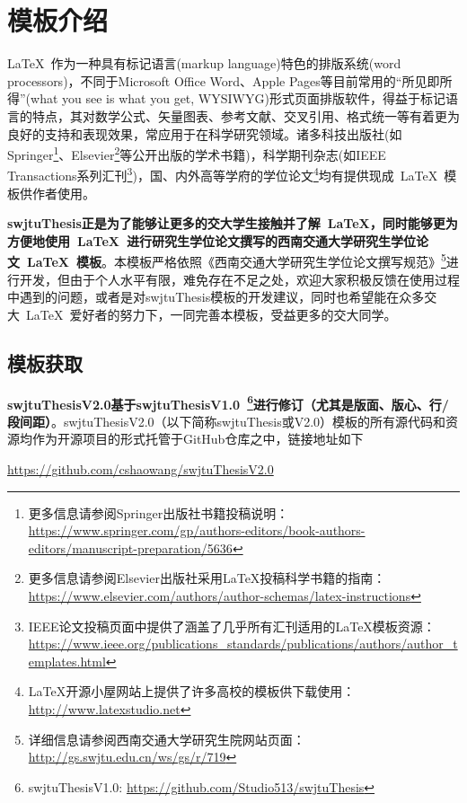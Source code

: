 
\chapter{模板介绍}

\LaTeX{}~作为一种具有标记语言(markup language)特色的排版系统(word processors)，不同于Microsoft Office Word\textsuperscript{\textregistered}、Apple Pages\textsuperscript{\textregistered}等目前常用的“所见即所得”(what you see is what you get, WYSIWYG)形式页面排版软件，得益于标记语言的特点，其对数学公式、矢量图表、参考文献、交叉引用、格式统一等有着更为良好的支持和表现效果，常应用于在科学研究领域。诸多科技出版社(如Springer\footnote{更多信息请参阅Springer出版社书籍投稿说明：\url{https://www.springer.com/gp/authors-editors/book-authors-editors/manuscript-preparation/5636}}、Elsevier\footnote{更多信息请参阅Elsevier出版社采用\LaTeX{}投稿科学书籍的指南：\url{https://www.elsevier.com/authors/author-schemas/latex-instructions}}等公开出版的学术书籍)，科学期刊杂志(如IEEE Transactions系列汇刊\footnote{IEEE论文投稿页面中提供了涵盖了几乎所有汇刊适用的\LaTeX{}模板资源：\url{https://www.ieee.org/publications_standards/publications/authors/author_templates.html}})，国、内外高等学府的学位论文\footnote{\LaTeX 开源小屋网站上提供了许多高校的模板供下载使用：\url{http://www.latexstudio.net}}均有提供现成~\LaTeX{}~模板供作者使用。

\par
\textbf{swjtuThesis正是为了能够让更多的交大学生接触并了解~\LaTeX{}，同时能够更为方便地使用~\LaTeX{}~进行研究生学位论文撰写的西南交通大学研究生学位论文~\LaTeX{}~模板}。本模板严格依照《西南交通大学研究生学位论文撰写规范》\footnote{详细信息请参阅西南交通大学研究生院网站页面：\url{http://gs.swjtu.edu.cn/ws/gs/r/719}}进行开发，但由于个人水平有限，难免存在不足之处，欢迎大家积极反馈在使用过程中遇到的问题，或者是对swjtuThesis模板的开发建议，同时也希望能在众多交大~\LaTeX{}~爱好者的努力下，一同完善本模板，受益更多的交大同学。


\section{模板获取}

\textbf{swjtuThesisV2.0基于swjtuThesisV1.0~\footnote{swjtuThesisV1.0: \url{https://github.com/Studio513/swjtuThesis}}进行修订（尤其是版面、版心、行/段间距）}。swjtuThesisV2.0（以下简称swjtuThesis或V2.0）模板的所有源代码和资源均作为开源项目的形式托管于GitHub仓库之中，链接地址如下 
\par
\begin{center}
	\url{https://github.com/cshaowang/swjtuThesisV2.0}
\end{center}


